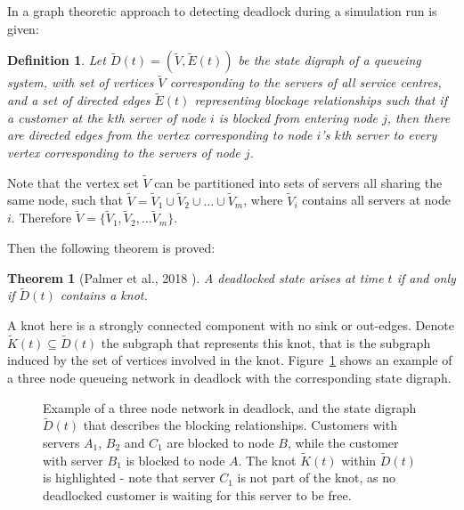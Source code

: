 \documentclass{article}
\newtheorem{definition}{Definition}
\newtheorem{theorem}{Theorem}
\begin{document}
In \cite{palmer2018} a graph theoretic approach to detecting deadlock during a
simulation run is given:

\begin{definition}\label{def:statedigraph}
Let $\tilde{D}(t) = (\tilde{V}, \tilde{E}(t))$ be the state digraph of a
queueing system, with set of vertices $\tilde{V}$ corresponding to the servers
of all service centres, and a set of directed edges $\tilde{E}(t)$ representing
blockage relationships such that if a customer at the $k$th server of node $i$
is blocked from entering node $j$, then there are directed edges from the vertex
corresponding to node $i$'s $k$th server to every vertex corresponding to the
servers of node $j$.
\end{definition}

Note that the vertex set $\tilde{V}$ can be partitioned into sets of servers
all sharing the same node, such that
$\tilde{V} = \tilde{V}_1 \cup \tilde{V}_2 \cup \dots \cup \tilde{V}_m$, where
$\tilde{V}_i$ contains all servers at node $i$.
Therefore $\tilde{V} = \{\tilde{V}_1, \tilde{V}_2, \dots \tilde{V}_m\}$.

Then the following theorem is proved: 

\begin{theorem}[Palmer et al., 2018 \cite{palmer2018}]
A deadlocked state arises at time $t$ if and only if $\tilde{D}(t)$ contains a
knot.
\end{theorem}

A knot here is a strongly connected component with no sink or out-edges.
Denote $\tilde{K}(t) \subseteq \tilde{D}(t)$ the subgraph that represents this
knot, that is the subgraph induced by the set of vertices involved in the knot.
Figure~\ref{fig:exampledigraph} shows an example of a three node queueing
network in deadlock with the corresponding state digraph.

\begin{figure}
\begin{center}

\end{center}
\caption{Example of a three node network in deadlock, and the state digraph
$\tilde{D}(t)$ that describes the blocking relationships.
Customers with servers $A_1$, $B_2$ and $C_1$ are blocked to node $B$, while the
customer with server $B_1$ is blocked to node $A$.
The knot $\tilde{K}(t)$ within $\tilde{D}(t)$ is highlighted - note that server
$C_1$ is not part of the knot, as no deadlocked customer is waiting for this
server to be free.}
\label{fig:exampledigraph}
\end{figure}
\end{document}
